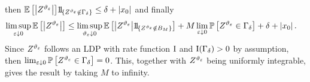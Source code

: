 then $\EE\left[ \left\vert Z^{\vartheta_{\eps}} \right\vert \right]\ind_{\left \{ Z^{\vartheta_{\eps}} \notin \Gamma_\delta \right \}} \leq \delta + |x_0|$ and finally
\begin{align*}
\limsup_{\eps\downarrow 0} \EE\left[ \left\vert Z^{\vartheta_{\eps}} \right\vert \right]  &\leq \limsup_{{\vartheta_{\eps}}\downarrow 0}\EE\left[ \left\vert Z^{\vartheta_{\eps}} \right\vert \ind_{\left \{Z^{\vartheta_{\eps}} \notin B_M \right \}} \right] + M\lim_{\eps\downarrow 0} \PP\left[ Z^{\vartheta_{\eps}} \in \Gamma_\delta \right ] + \delta + |x_0|\,.
\end{align*}
Since $Z^{\vartheta_{\varepsilon}}$ follows an LDP with rate function $\mathrm{I}$ %
and $\mathrm{I}(\Gamma_\delta)>0$ by assumption, then $\lim_{\varepsilon\downarrow 0} \mathbb{P}\left[ Z^{\vartheta_{\varepsilon}} \in \Gamma_\delta \right ] = 0$. This, together with $Z^{\vartheta_{\varepsilon}}$ being uniformly integrable, gives the result by taking $M$ to infinity.


